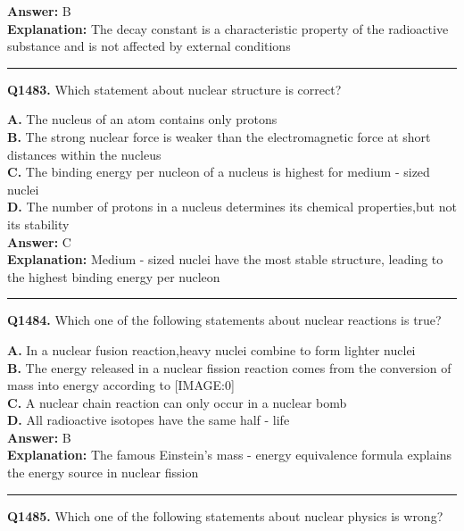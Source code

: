 \documentclass[12pt]{article}
\begin{document}
\textbf{Answer:} B \\
\textbf{Explanation:} The decay constant is a characteristic property of the radioactive substance and is not affected by external conditions

\hrule
\vspace{1em}


\noindent
\textbf{Q1483.} Which statement about nuclear structure is correct?



\textbf{A.} The nucleus of an atom contains only protons \\
\textbf{B.} The strong nuclear force is weaker than the electromagnetic force at short distances within the nucleus \\
\textbf{C.} The binding energy per nucleon of a nucleus is highest for medium - sized nuclei \\
\textbf{D.} The number of protons in a nucleus determines its chemical properties,but not its stability \\

\textbf{Answer:} C \\
\textbf{Explanation:} Medium - sized nuclei have the most stable structure, leading to the highest binding energy per nucleon

\hrule
\vspace{1em}


\noindent
\textbf{Q1484.} Which one of the following statements about nuclear reactions is true?



\textbf{A.} In a nuclear fusion reaction,heavy nuclei combine to form lighter nuclei \\
\textbf{B.} The energy released in a nuclear fission reaction comes from the conversion of mass into energy according to
[IMAGE:0] \\
\textbf{C.} A nuclear chain reaction can only occur in a nuclear bomb \\
\textbf{D.} All radioactive isotopes have the same half - life \\

\textbf{Answer:} B \\
\textbf{Explanation:} The famous Einstein's mass - energy equivalence formula explains the energy source in nuclear fission

\hrule
\vspace{1em}


\noindent
\textbf{Q1485.} Which one of the following statements about nuclear physics is wrong?
\end{document}
